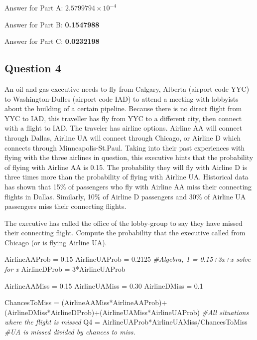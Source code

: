 \documentclass[
]{article}
\newenvironment{Shaded}{\begin{snugshade}}{\end{snugshade}}
\newcommand{\CommentTok}[1]{\textcolor[rgb]{0.56,0.35,0.01}{\textit{#1}}}
\newcommand{\DecValTok}[1]{\textcolor[rgb]{0.00,0.00,0.81}{#1}}
\newcommand{\FloatTok}[1]{\textcolor[rgb]{0.00,0.00,0.81}{#1}}
\newcommand{\NormalTok}[1]{#1}
\newcommand{\OtherTok}[1]{\textcolor[rgb]{0.56,0.35,0.01}{#1}}
\newcommand{\SpecialCharTok}[1]{\textcolor[rgb]{0.00,0.00,0.00}{#1}}
\begin{document}
Answer for Part A: \textbf{\ensuremath{2.5799794\times 10^{-4}}}

Answer for Part B: \textbf{0.1547988}

Answer for Part C: \textbf{0.0232198}

\hypertarget{question-4}{%
\subsection{Question 4}\label{question-4}}

An oil and gas executive needs to fly from Calgary, Alberta (airport
code YYC) to Washington-Dulles (airport code IAD) to attend a meeting
with lobbyists about the building of a certain pipeline. Because there
is no direct flight from YYC to IAD, this traveller has fly from YYC to
a different city, then connect with a flight to IAD. The traveler has
airline options. Airline AA will connect through Dallas, Airline UA will
connect through Chicago, or Airline D which connects through
Minneapolis-St.Paul. Taking into their past experiences with flying with
the three airlines in question, this executive hints that the
probability of flying with Airline AA is 0.15. The probability they will
fly with Airline D is three times more than the probability of flying
with Airline UA. Historical data has shown that 15\% of passengers who
fly with Airline AA miss their connecting flights in Dallas. Similarly,
10\% of Airline D passengers and 30\% of Airline UA passengers miss
their connecting flights.

The executive has called the office of the lobby-group to say they have
missed their connecting flight. Compute the probability that the
executive called from Chicago (or is flying Airline UA).

\begin{Shaded}
\begin{Highlighting}[]
\NormalTok{AirlineAAProb }\OtherTok{=} \FloatTok{0.15}
\NormalTok{AirlineUAProb }\OtherTok{=} \FloatTok{0.2125} \CommentTok{\#Algebra, 1 = 0.15+3x+x solve for x}
\NormalTok{AirlineDProb }\OtherTok{=} \DecValTok{3}\SpecialCharTok{*}\NormalTok{AirlineUAProb}

\NormalTok{AirlineAAMiss }\OtherTok{=} \FloatTok{0.15}
\NormalTok{AirlineUAMiss }\OtherTok{=} \FloatTok{0.30}
\NormalTok{AirlineDMiss }\OtherTok{=} \FloatTok{0.1}

\NormalTok{ChancesToMiss }\OtherTok{=}\NormalTok{ (AirlineAAMiss}\SpecialCharTok{*}\NormalTok{AirlineAAProb)}\SpecialCharTok{+}\NormalTok{(AirlineDMiss}\SpecialCharTok{*}\NormalTok{AirlineDProb)}\SpecialCharTok{+}\NormalTok{(AirlineUAMiss}\SpecialCharTok{*}\NormalTok{AirlineUAProb) }\CommentTok{\#All situations where the flight is missed}
\NormalTok{Q4 }\OtherTok{=}\NormalTok{ AirlineUAProb}\SpecialCharTok{*}\NormalTok{AirlineUAMiss}\SpecialCharTok{/}\NormalTok{ChancesToMiss }\CommentTok{\#UA is missed divided by chances to miss. }
\end{Highlighting}
\end{Shaded}
\end{document}
